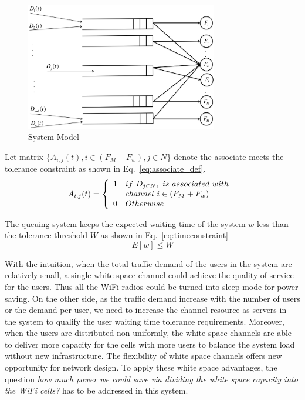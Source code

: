 


\begin{figure}
\vspace{-0.0in}
\centering
\includegraphics[width=84mm]{figures/flowconfig}
\vspace{-0.1in}
\caption{System Model}
\label{fig:flowconfig}
\vspace{-0.1in}
\end{figure}

Let matrix \{$A_{i,j}(t),i\in (F_M+F_w), j\in N$\} denote the associate meets the 
tolerance constraint as shown in Eq.~\ref{eq:associate_def}.
\begin{equation}
\label{eq:associate_def}
 A_{i,j}(t) = \left\{ 
	  \begin{array}{l l}
	    1   &  if\ D_{j\in N},\ is\ associated\ with\ \\
		& channel\ i \in (F_M+F_w) \\
		0 &  Otherwise
			    \end{array} \right.
\end{equation}

The queuing system keeps the expected waiting time of the system $w$ less than the tolerance threshold $W$ 
as shown in Eq.~\ref{eq:timeconstraint}
\begin{equation}
\label{eq:timeconstraint}
E[w]\le W
\end{equation}

With the intuition, when the total traffic demand of the users in the system are relatively small, a single 
white space channel could achieve the quality of service for the users. Thus all the WiFi radios could be turned 
into sleep mode for power saving. 
On the other side, as the traffic demand increase with the number of users or the demand per user, we need 
to increase the channel resource as servers in the system to qualify the user waiting time tolerance requirements. 
Moreover, when the users are distributed non-uniformly, the white space channels are able to deliver more capacity for 
the cells with more users to balance the system load without new infrastructure. 
The flexibility of white space channels offers new opportunity for network design.
To apply these white space advantages, the question {\it how much power we could save via dividing the white space 
capacity into the WiFi cells?} has to be addressed in this system.

